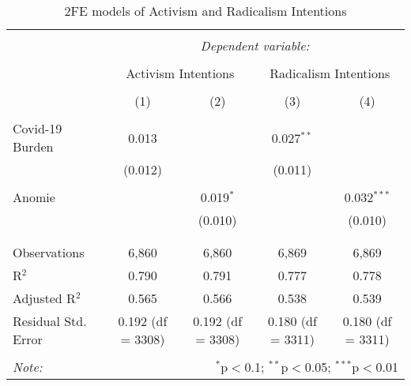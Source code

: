 
\begin{table}[!htbp] \centering 
  \caption{2FE models of Activism and Radicalism Intentions} 
  \label{tab:aisris} 
\begin{tabular}{@{\extracolsep{5pt}}lcccc} 
\\[-1.8ex]\hline 
\hline \\[-1.8ex] 
 & \multicolumn{4}{c}{\textit{Dependent variable:}} \\ 
\cline{2-5} 
\\[-1.8ex] & \multicolumn{2}{c}{Activism Intentions} & \multicolumn{2}{c}{Radicalism Intentions} \\ 
\\[-1.8ex] & (1) & (2) & (3) & (4)\\ 
\hline \\[-1.8ex] 
 Covid-19 Burden & 0.013 &  & 0.027$^{**}$ &  \\ 
  & (0.012) &  & (0.011) &  \\ 
  & & & & \\ 
 Anomie &  & 0.019$^{*}$ &  & 0.032$^{***}$ \\ 
  &  & (0.010) &  & (0.010) \\ 
  & & & & \\ 
\hline \\[-1.8ex] 
Observations & 6,860 & 6,860 & 6,869 & 6,869 \\ 
R$^{2}$ & 0.790 & 0.791 & 0.777 & 0.778 \\ 
Adjusted R$^{2}$ & 0.565 & 0.566 & 0.538 & 0.539 \\ 
Residual Std. Error & 0.192 (df = 3308) & 0.192 (df = 3308) & 0.180 (df = 3311) & 0.180 (df = 3311) \\ 
\hline 
\hline \\[-1.8ex] 
\textit{Note:}  & \multicolumn{4}{r}{$^{*}$p$<$0.1; $^{**}$p$<$0.05; $^{***}$p$<$0.01} \\ 
\end{tabular} 
\end{table} 
